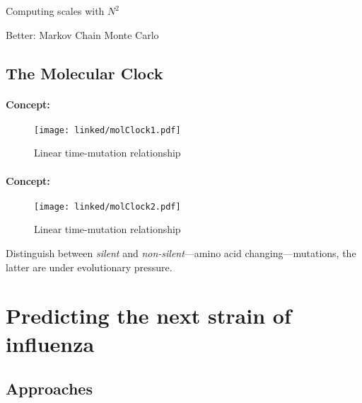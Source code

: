 \documentclass{beamer}
\begin{document}
\begin{darkframes}
\begin{frame}{\secname}
      Computing scales with $N^2$

      Better: Markov Chain Monte Carlo

    \end{frame}


    \subsection{The Molecular Clock}

    \begin{frame}{\secname}
      \framesubtitle{Concept: \subsecname}
      \begin{figure}
        \texttt{[image: linked/molClock1.pdf]}
        \caption{\footnotesize Linear time-mutation relationship}
      \end{figure}
      \addtocounter{figure}{-1}
    \end{frame}


    \begin{frame}{\secname}
      \framesubtitle{Concept: \subsecname}
      \begin{figure}
        \texttt{[image: linked/molClock2.pdf]}
        \caption{\footnotesize Linear time-mutation relationship}
      \end{figure}
      \vspace*{-.6cm}
      \footnotesize
      Distinguish between \textit{silent} and \textit{non-silent}---amino acid changing---mutations, the latter are under evolutionary pressure.
    \end{frame}





  \section{Predicting the next strain of influenza}



    \subsection{Approaches}

    \begin{frame}{\secname}
      \framesubtitle{\subsecname}

\end{frame}
\end{darkframes}
\end{document}
